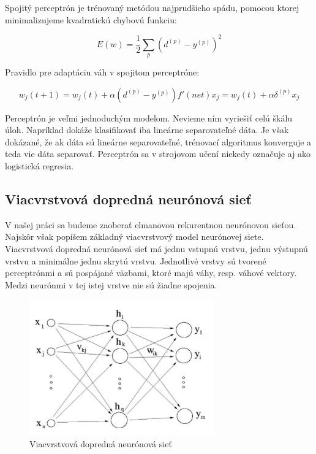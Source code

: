Spojitý perceptrón je trénovaný metódou najprudšieho spádu, pomocou
ktorej minimalizujeme kvadratickú chybovú funkciu:

\begin{equation}
	E(w) = \frac{1}{2}\sum_{p}(d^(p) - y^(p))^{2} 
\end{equation}

Pravidlo pre adaptáciu váh v spojitom perceptróne:

\begin{equation}
	w_{j}(t+1) = w_{j}(t) + \alpha (d^(p) - y^(p))f'(net)x_{j} = w_{j}(t) + \alpha \delta^(p)x_{j}
\end{equation}



Perceptrón je veľmi jednoduchým modelom. 
Nevieme ním vyriešiť celú škálu úloh. Napríklad dokáže klasifikovať 
iba lineárne separovateľné dáta. Je však dokázané, že ak dáta sú lineárne separovateľné, trénovací algoritmus
konverguje a teda vie dáta separovať.
Perceptrón sa v strojovom učení niekedy označuje aj ako logistická regresia.

\subsection{Viacvrstvová dopredná neurónová sieť}
V našej práci sa budeme zaoberať elmanovou rekurentnou neurónovou sieťou. Najskôr však popíšem základný viacvrstvový model
neurónovej siete. 
Viacvrstvová dopredná neurónová sieť má jednu vstupnú vrstvu, jednu výstupnú vrstvu a minimálne jednu skrytú vrstvu. 
Jednotlivé vrstvy sú tvorené perceptrónmi a sú pospájané väzbami, ktoré majú váhy, resp. váhové vektory. 
Medzi neurónmi v tej istej vrstve nie sú žiadne spojenia.

\begin{figure}[H]
	\centering
	\includegraphics[width=8cm]{assets/mlp}
	\caption{Viacvrstvová dopredná neurónová sieť}
\end{figure}

